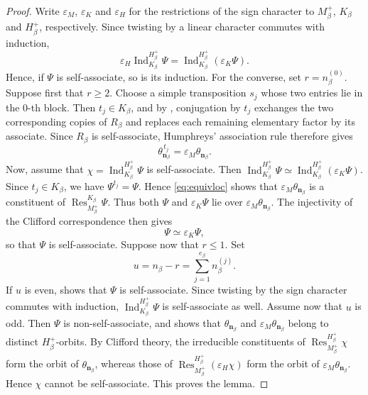 \documentclass[reqno]{amsart}
\DeclareMathOperator{\Res}{Res}
\DeclareMathOperator{\Ind}{Ind}
\theoremstyle{definition}
\begin{document}
\begin{proof}
Write $\varepsilon_M$, $\varepsilon_K$ and $\varepsilon_H$ for the
restrictions of the sign character to $M_\beta^+$, $K_\beta$ and
$H_\beta^+$, respectively. Since twisting by a linear character commutes
with induction,
\[
\varepsilon_H\Ind_{K_\beta}^{H_\beta^+}\Psi
=
\Ind_{K_\beta}^{H_\beta^+}(\varepsilon_K\Psi).
\]
Hence, if $\Psi$ is self-associate, so is its induction. For the converse,
set $ r=n_\beta^{(0)}$. Suppose first that $r\geq2$. Choose a simple
transposition $s_j$ whose two entries lie in the $0$-th block. Then
$t_j\in K_\beta$, and by \cite[Lemma~3.11]{MichlerOlsson}, conjugation by
$t_j$ exchanges the two corresponding copies of $R_\beta$ and replaces
each remaining elementary factor by its associate. Since $R_\beta$ is
self-associate, Humphreys' association rule
\cite[Proposition~1.2]{MichlerOlsson} therefore gives
\begin{equation}
\label{eq:equivloc}
\theta_{\mathbf n_\beta}^{\,t_j}
=
\varepsilon_M\theta_{\mathbf n_\beta}.
\end{equation}
Now, assume that $ \chi=\Ind_{K_\beta}^{H_\beta^+}\Psi $ is
self-associate. Then $ \Ind_{K_\beta}^{H_\beta^+}\Psi \simeq
\Ind_{K_\beta}^{H_\beta^+}(\varepsilon_K\Psi) $.
Since $t_j\in K_\beta$, we have $\Psi^{t_j}=\Psi$. Hence
\eqref{eq:equivloc} shows that $\varepsilon_M\theta_{\mathbf n_\beta}$ is a
constituent of $\Res_{M_\beta^+}^{K_\beta}\Psi$. Thus both $\Psi$ and
$\varepsilon_K\Psi$ lie over $\varepsilon_M\theta_{\mathbf n_\beta}$.
The injectivity of the Clifford correspondence then gives
\[
\Psi\simeq\varepsilon_K\Psi,
\]
so that $\Psi$ is self-associate. Suppose now that $r\leq1$. Set
\[
u=n_\beta-r=\sum_{j=1}^{e_\beta}n_\beta^{(j)}.
\]
If $u$ is even, \cite[Proposition 1.2]{MichlerOlsson} shows that $\Psi$ is
self-associate. Since twisting by the sign character commutes with
induction, $\Ind_{K_\beta}^{H_\beta^+}\Psi$ is self-associate as well.
Assume now that $u$ is odd. Then $\Psi$ is non-self-associate, and
\cite[Proposition~3.12]{MichlerOlsson} shows that $\theta_{\mathbf
n_\beta}$ and $\varepsilon_M\theta_{\mathbf n_\beta}$ belong to distinct
$H_\beta^+$-orbits. By Clifford theory, the irreducible constituents of
$\Res_{M_\beta^+}^{H_\beta^+}\chi$ form the orbit of $\theta_{\mathbf
n_\beta}$, whereas those of
$\Res_{M_\beta^+}^{H_\beta^+}(\varepsilon_H\chi)$ form the orbit of
$\varepsilon_M\theta_{\mathbf n_\beta}$. Hence $\chi$ cannot be
self-associate.
This proves the lemma.
\end{proof}
\end{document}
